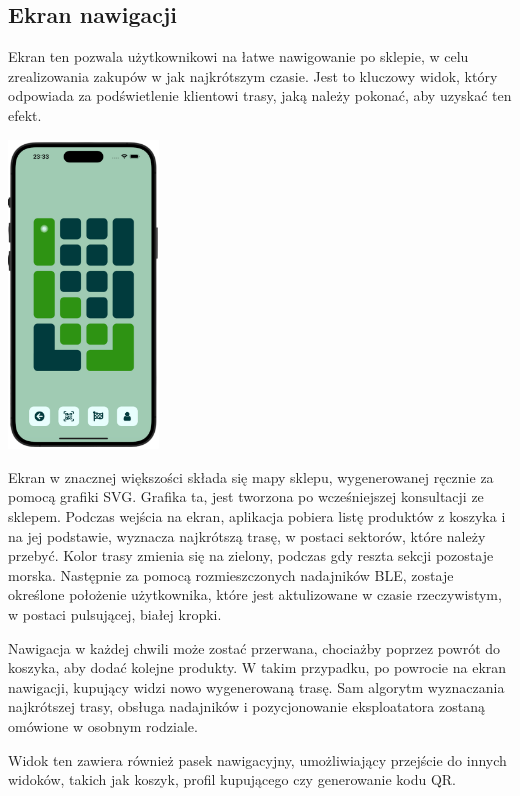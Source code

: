 \subsection{Ekran nawigacji}

Ekran ten pozwala użytkownikowi na łatwe nawigowanie po sklepie, w celu zrealizowania zakupów w jak najkrótszym czasie. Jest to kluczowy widok, który odpowiada za podświetlenie klientowi trasy, jaką należy pokonać, aby uzyskać ten efekt.

\begin{center}
\includegraphics[width=0.3\textwidth]{images/front/navigation_page.png}
\end{center}

Ekran w znacznej większości składa się mapy sklepu, wygenerowanej ręcznie za pomocą grafiki SVG. Grafika ta, jest tworzona po wcześniejszej konsultacji ze sklepem. Podczas wejścia na ekran, aplikacja pobiera listę produktów z koszyka i na jej podstawie, wyznacza najkrótszą trasę, w postaci sektorów, które należy przebyć. Kolor trasy zmienia się na zielony, podczas gdy reszta sekcji pozostaje morska. Następnie za pomocą rozmieszczonych nadajników BLE, zostaje określone położenie użytkownika, które jest aktulizowane w czasie rzeczywistym, w postaci pulsującej, białej kropki.

Nawigacja w każdej chwili może zostać przerwana, chociażby poprzez powrót do koszyka, aby dodać kolejne produkty. W takim przypadku, po powrocie na ekran nawigacji, kupujący widzi nowo wygenerowaną trasę. Sam algorytm wyznaczania najkrótszej trasy, obsługa nadajników i pozycjonowanie eksploatatora zostaną omówione w osobnym rodziale.

Widok ten zawiera również pasek nawigacyjny, umożliwiający przejście do innych widoków, takich jak koszyk, profil kupującego czy generowanie kodu QR.

